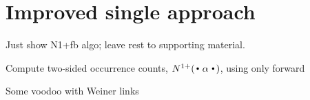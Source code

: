\section{Improved single \CST approach}

Just show N1+fb algo; leave rest to supporting material.

\begin{algorithm}
  \caption{Compute two-sided occurrence counts, $\nlplus{\dotpatdot}$, using only forward \CST 
    \label{alg:n1plusfb_wt}}
  \begin{algorithmic}[1]
        \If{$\depth{\tf}{\nf} > |\alpha|$}   
        \Else
              \State Some voodoo with Weiner links
            \EndFor
          \EndIf
      \State {}
    \EndFunction
  \end{algorithmic}
\end{algorithm}


